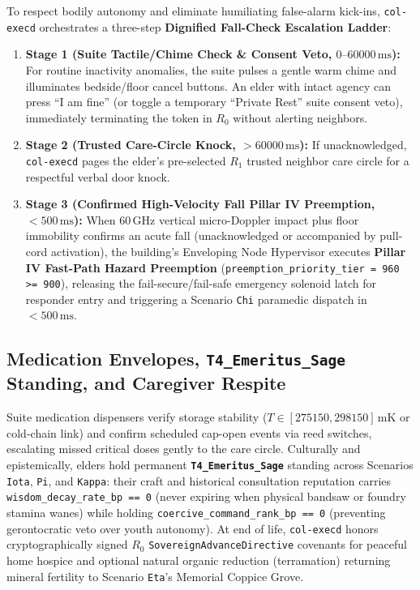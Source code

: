 To respect bodily autonomy and eliminate humiliating false-alarm kick-ins, \texttt{col-execd} orchestrates a three-step \textbf{Dignified Fall-Check
Escalation Ladder}:
\begin{enumerate}
    \item \textbf{Stage 1 (Suite Tactile/Chime Check \& Consent Veto, $0\text{--}60000\,\mathrm{ms}$):} For routine inactivity anomalies, the suite
    pulses a gentle warm chime and illuminates bedside/floor cancel buttons. An elder with intact agency can press ``I am fine'' (or toggle a temporary
    ``Private Rest'' suite consent veto), immediately terminating the token in $R_0$ without alerting neighbors.
    \item \textbf{Stage 2 (Trusted Care-Circle Knock, $> 60000\,\mathrm{ms}$):} If unacknowledged, \texttt{col-execd} pages the elder's pre-selected
    $R_1$ trusted neighbor care circle for a respectful verbal door knock.
    \item \textbf{Stage 3 (Confirmed High-Velocity Fall Pillar IV Preemption, $< 500\,\mathrm{ms}$):} When $60\,\mathrm{GHz}$ vertical micro-Doppler impact plus
    floor immobility confirms an acute fall (unacknowledged or accompanied by pull-cord activation), the building's Enveloping Node Hypervisor executes
    \textbf{Pillar IV Fast-Path Hazard Preemption} (\texttt{preemption\_priority\_tier = 960 >= 900}), releasing the fail-secure/fail-safe emergency
    solenoid latch for responder entry and triggering a Scenario \texttt{Chi} paramedic dispatch in $< 500\,\mathrm{ms}$.
\end{enumerate}

\subsection{Medication Envelopes, \texttt{T4\_Emeritus\_Sage} Standing, and Caregiver Respite}

Suite medication dispensers verify storage stability ($T \in [275150, 298150]\,\mathrm{mK}$ or cold-chain link) and confirm scheduled cap-open events
via reed switches, escalating missed critical doses gently to the care circle. Culturally and epistemically, elders hold permanent
\textbf{\texttt{T4\_Emeritus\_Sage}} standing across Scenarios \texttt{Iota}, \texttt{Pi}, and \texttt{Kappa}: their craft and historical consultation
reputation carries \texttt{wisdom\_decay\_rate\_bp == 0} (never expiring when physical bandsaw or foundry stamina wanes) while holding
\texttt{coercive\_command\_rank\_bp == 0} (preventing gerontocratic veto over youth autonomy). At end of life, \texttt{col-execd} honors
cryptographically signed $R_0$ \texttt{SovereignAdvanceDirective} covenants for peaceful home hospice and optional natural organic reduction
(terramation) returning mineral fertility to Scenario \texttt{Eta}'s Memorial Coppice Grove.

